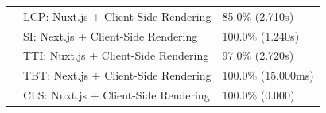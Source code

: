 \begin{table}[H]
{\begin{tabular}{|l|l|l|}
                                & LCP: Nuxt.js + Client-Side Rendering         & 85.0\% (2.710s)    \\[0.2em]
                                & SI: Next.js + Client-Side Rendering          & 100.0\% (1.240s)   \\[0.2em]
                                & TTI: Nuxt.js + Client-Side Rendering         & 97.0\% (2.720s)    \\[0.2em]
                                & TBT: Next.js + Client-Side Rendering         & 100.0\% (15.000ms) \\[0.2em]
                                & CLS: Nuxt.js + Client-Side Rendering         & 100.0\% (0.000)    \\
            \hline
        \end{tabular}%
    }
\end{table}

